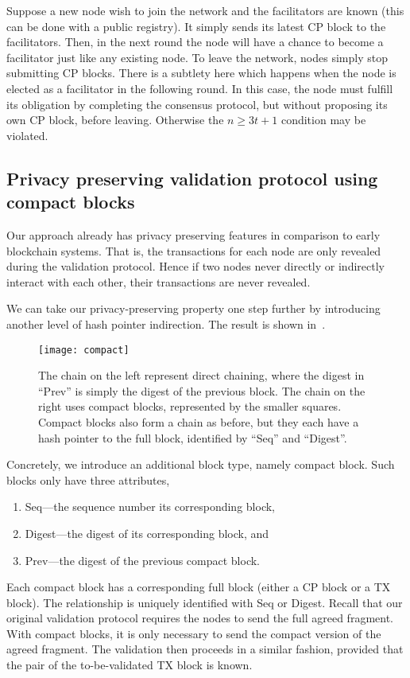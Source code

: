 Suppose a new node wish to join the network and the facilitators are known (this can be done with a public registry).
It simply sends its latest CP block to the facilitators.
Then, in the next round the node will have a chance to become a facilitator just like any existing node.
To leave the network, nodes simply stop submitting CP blocks.
There is a subtlety here which happens when the node is elected as a facilitator in the following round.
In this case, the node must fulfill its obligation by completing the consensus protocol, but without proposing its own CP block, before leaving.
Otherwise the $n \ge 3t + 1$ condition may be violated.

\subsection{Privacy preserving validation protocol using compact blocks}
\label{sec:compact}
Our approach already has privacy preserving features in comparison to early blockchain systems.
That is, the transactions for each node are only revealed during the validation protocol.
Hence if two nodes never directly or indirectly interact with each other,
their transactions are never revealed.

We can take our privacy-preserving property one step further by introducing another level of hash pointer indirection.
The result is shown in~.
\begin{figure}
    \texttt{[image: compact]}
    \centering
    \caption{The chain on the left represent direct chaining, where the digest in ``Prev'' is simply the digest of the previous block.
    The chain on the right uses compact blocks, represented by the smaller squares.
    Compact blocks also form a chain as before, but they each have a hash pointer to the full block, identified by ``Seq'' and ``Digest''.}
    \label{fig:compact}
\end{figure}

Concretely, we introduce an additional block type,
namely compact block.
Such blocks only have three attributes,
\begin{enumerate}
\item Seq---the sequence number its corresponding block,
\item Digest---the digest of its corresponding block, and
\item Prev---the digest of the previous compact block.
\end{enumerate}
Each compact block has a corresponding full block (either a CP block or a TX block).
The relationship is uniquely identified with Seq or Digest.
Recall that our original validation protocol requires the nodes to send the full agreed fragment.
With compact blocks, it is only necessary to send the compact version of the agreed fragment.
The validation then proceeds in a similar fashion,
provided that the pair of the to-be-validated TX block is known.


